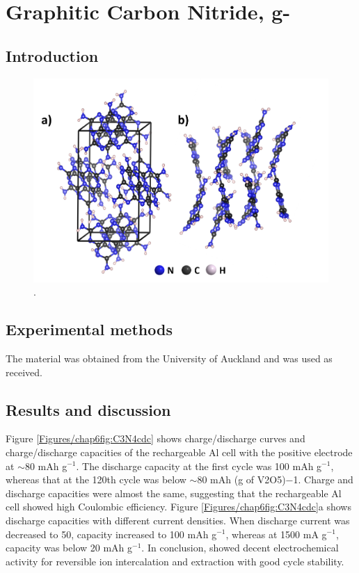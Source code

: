 \section{Graphitic Carbon Nitride, g-}

\subsection{Introduction}

\begin{figure}[th!]
\centering
\includegraphics[width=\textwidth]{Figures/chap6fig/C3N4crys}
\caption{.}
\label{Figures/chap6fig:C3N4crys}
\end{figure}
\subsection{Experimental methods}
The material was obtained from the University of Auckland and was used as received. 

\subsection{Results and discussion}
Figure \ref{Figures/chap6fig:C3N4cdc} shows charge/discharge curves and charge/discharge capacities of the rechargeable Al cell with the  positive electrode at $\sim$80 mAh g$^{-1}$. The discharge capacity at the first cycle was 100 mAh g$^{-1}$, whereas that at the 120th cycle was below $\sim$80 mAh (g of V2O5)−1. Charge and discharge capacities were almost the same, suggesting that the rechargeable Al cell showed high Coulombic efficiency. Figure \ref{Figures/chap6fig:C3N4cdc}a shows discharge capacities with different current densities. When discharge current was decreased to 50, capacity increased to 100 mAh g$^{-1}$, whereas at 1500 mA g$^{-1}$, capacity was below 20 mAh g$^{-1}$. In conclusion,  showed decent electrochemical activity for reversible ion intercalation and extraction with good cycle stability. 

